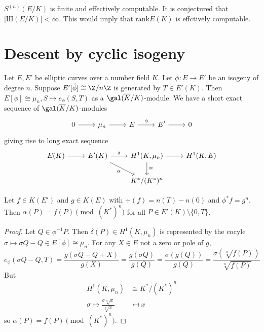 \documentclass[a4paper]{article}
\theoremstyle{definition}
\theoremstyle{theorem}
\begin{document}
\begin{remark}
  \(S^{(n)}(E/K)\) is finite and effectively computable. It is conjectured that \(|Ш(E/K)| < \infty\). This would imply that \(\mathrm{rank} E(K)\) is effctively computable.
\end{remark}

\section{Descent by cyclic isogeny}

Let \(E, E'\) be elliptic curves over a number field \(K\). Let \(\phi: E \to E'\) be an isogeny of degree \(n\). Suppose \(E'[\hat \phi] \cong \Z/n\Z\) is generated by \(T \in E'(K)\). Then \(E[\phi] \cong \mu_n, S \mapsto e_\phi(S, T)\) as a \(\gal(\overline K/K)\)-module. We have a short exact sequence of \(\gal(\overline K/K)\)-modules
\[
  \begin{tikzcd}
    0 \ar[r] & \mu_n \ar[r] & E \ar[r, "\phi"] & E' \ar[r] & 0
  \end{tikzcd}
\]
giving rise to long exact sequence
\[
  \begin{tikzcd}
    E(K) \ar[r] & E'(K) \ar[r, "\delta"] \ar[dr, "\alpha"'] & H^1(K, \mu_n) \ar[r] \ar[d, "\cong"] & H^1(K, E) \\
    & & K^*/(K^*)^n
  \end{tikzcd}
\]

\begin{theorem}
  Let \(f \in K(E')\) and \(g \in K(E)\) with \(\div (f) = n(T) - n(0)\) and \(\phi^* f = g^n\). Then \(\alpha(P) = f(P) \pmod{(K^*)^n}\) for all \(P \in E'(K) \setminus \{0, T\}\).
\end{theorem}

\begin{proof}
  Let \(Q \in \phi^{-1}P\). Then \(\delta(P) \in H^1(K, \mu_n)\) is represented by the cocyle \(\sigma \mapsto \sigma Q - Q \in E[\phi] \cong \mu_n\). For any \(X \in E\) not a zero or pole of \(g\),
  \[
    e_\phi(\sigma Q - Q, T)
    = \frac{g(\sigma Q - Q + X)}{g(X)}
    = \frac{g(\sigma Q)}{g(Q)}
    = \frac{\sigma(g(Q))}{g(Q)}
    = \frac{\sigma(\sqrt[n]{f(P)})}{\sqrt[n]{f(P)}}
  \]
  But
  \begin{align*}
    H^1(K, \mu_n) &\cong K^*/(K^*)^n \\
    \sigma \mapsto \frac{\sigma \sqrt[n]{x}}{\sqrt[n]{x}} &\mapsfrom x
  \end{align*}
  so \(\alpha(P) = f(P) \pmod{(K^*)^n}\).
\end{proof}
\end{document}
